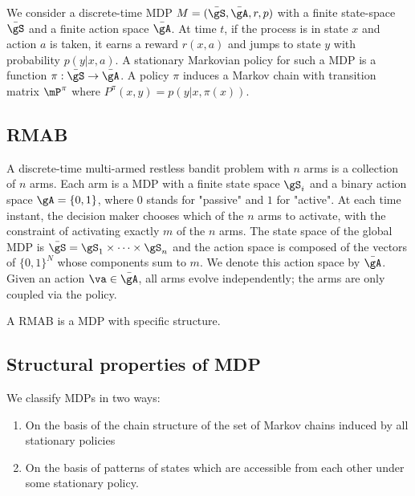 We consider a discrete-time MDP $M=(\bar{\gS},\bar{\gA},r,p)$ with a finite state-space $\bar{\gS}$ and a finite action space $\bar\gA$. At time $t$, if the process is in state $x$ and action $a$ is taken, it earns a reward $r(x,a)$ and jumps to state $y$ with probability $p(y|x,a)$. A stationary Markovian policy for such a MDP is a function $\pi:\bar{\gS}\to\bar\gA$. A policy $\pi$ induces a Markov chain with transition matrix $\mP^\pi$ where $P^\pi(x,y) = p(y | x, \pi(x))$. 

\subsection{RMAB}

A discrete-time multi-armed restless bandit problem with $n$ arms is a collection of $n$ arms. Each arm is a MDP with a finite state space $\gS_i$ and a binary action space $\gA=\{0,1\}$, where $0$ stands for "passive" and $1$ for "active". At each time instant, the decision maker chooses which of the $n$ arms to activate, with the constraint of activating exactly $m$ of the $n$ arms. The state space of the global MDP is $\bar{\gS} = \gS_1\times\dots\times\gS_n$ and the action space is composed of the vectors of $\{0,1\}^N$ whose components sum to $m$. We denote this action space by $\bar{\gA}$.  Given an action $\va\in\bar{\gA}$, all arms evolve independently; the arms are only coupled via the policy.

A RMAB is a MDP with specific structure. 

\subsection{Structural properties of MDP}
\label{ssec:mdp_params}

We classify MDPs in two ways:

\begin{enumerate}
    \item On the basis of the chain structure of the set of Markov chains induced by all stationary policies
    \item On the basis of patterns of states which are accessible from each other under some stationary policy.
\end{enumerate}



